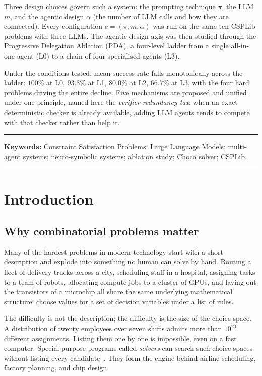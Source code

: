 \documentclass[11pt,a4paper]{article}
\begin{document}
Three design choices govern such a system: the prompting technique $\pi$, the LLM $m$, and the agentic design $\alpha$ (the number of LLM calls and how they are connected). Every configuration $c = (\pi, m, \alpha)$ was run on the same ten CSPLib problems with three LLMs. The agentic-design axis was then studied through the Progressive Delegation Ablation (PDA), a four-level ladder from a single all-in-one agent (L0) to a chain of four specialised agents (L3).

Under the conditions tested, mean success rate falls monotonically across the ladder: $100\%$ at L0, $93.3\%$ at L1, $80.0\%$ at L2, $66.7\%$ at L3, with the four hard problems driving the entire decline. Five mechanisms are proposed and unified under one principle, named here the \emph{verifier-redundancy tax}: when an exact deterministic checker is already available, adding LLM agents tends to compete with that checker rather than help it.
\vspace{0.4cm}
\hrule
\vspace{0.4cm}
\textbf{Keywords:} Constraint Satisfaction Problems; Large Language Models; multi-agent systems; neuro-symbolic systems; ablation study; Choco solver; CSPLib.

\newpage
\vspace{0.4cm}  
\hrule
\vspace{0.4cm}

\tableofcontents
\newpage

\section{Introduction}\label{sec:intro}

\subsection{Why combinatorial problems matter}\label{sec:intro:why}
Many of the hardest problems in modern technology start with a short description and explode into something no human can solve by hand. Routing a fleet of delivery trucks across a city, scheduling staff in a hospital, assigning tasks to a team of robots, allocating compute jobs to a cluster of GPUs, and laying out the transistors of a microchip all share the same underlying mathematical structure: choose values for a set of decision variables under a list of rules.

The difficulty is not the description; the difficulty is the size of the choice space. A distribution of twenty employees over seven shifts admits more than $10^{20}$ different assignments. Listing them one by one is impossible, even on a fast computer. Special-purpose programs called \emph{solvers} can search such choice spaces without listing every candidate~\cite{R1}. They form the engine behind airline scheduling, factory planning, and chip design.
\end{document}
